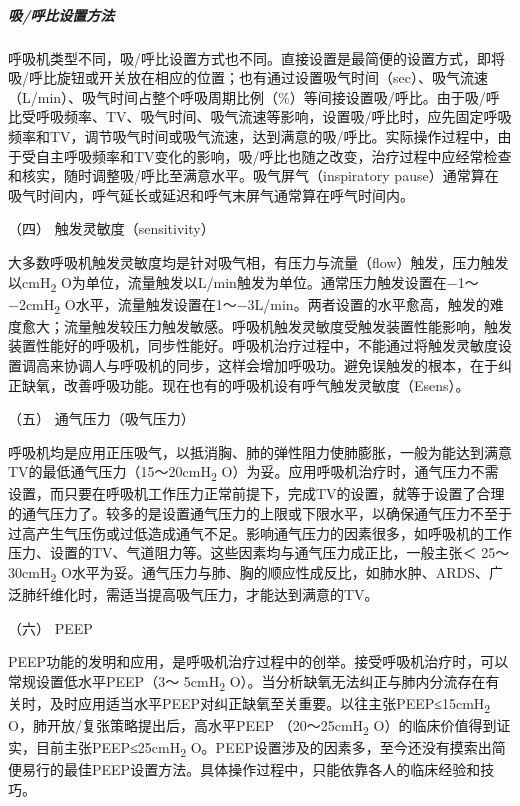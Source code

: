 \subparagraph{吸/呼比设置方法}

呼吸机类型不同，吸/呼比设置方式也不同。直接设置是最简便的设置方式，即将吸/呼比旋钮或开关放在相应的位置；也有通过设置吸气时间（sec）、吸气流速（L/min）、吸气时间占整个呼吸周期比例（\%）等间接设置吸/呼比。由于吸/呼比受呼吸频率、TV、吸气时间、吸气流速等影响，设置吸/呼比时，应先固定呼吸频率和TV，调节吸气时间或吸气流速，达到满意的吸/呼比。实际操作过程中，由于受自主呼吸频率和TV变化的影响，吸/呼比也随之改变，治疗过程中应经常检查和核实，随时调整吸/呼比至满意水平。吸气屏气（inspiratory
pause）通常算在吸气时间内，呼气延长或延迟和呼气末屏气通常算在呼气时间内。

\hypertarget{text00370.htmlux5cux23CHP16-3-4-1-4}{}
（四） 触发灵敏度（sensitivity）

大多数呼吸机触发灵敏度均是针对吸气相，有压力与流量（flow）触发，压力触发以cmH\textsubscript{2}
O为单位，流量触发以L/min触发为单位。通常压力触发设置在−1～−2cmH\textsubscript{2}
O水平，流量触发设置在1～−3L/min。两者设置的水平愈高，触发的难度愈大；流量触发较压力触发敏感。呼吸机触发灵敏度受触发装置性能影响，触发装置性能好的呼吸机，同步性能好。呼吸机治疗过程中，不能通过将触发灵敏度设置调高来协调人与呼吸机的同步，这样会增加呼吸功。避免误触发的根本，在于纠正缺氧，改善呼吸功能。现在也有的呼吸机设有呼气触发灵敏度（Esens）。

\hypertarget{text00370.htmlux5cux23CHP16-3-4-1-5}{}
（五） 通气压力（吸气压力）

呼吸机均是应用正压吸气，以抵消胸、肺的弹性阻力使肺膨胀，一般为能达到满意TV的最低通气压力（15～20cmH\textsubscript{2}
O）为妥。应用呼吸机治疗时，通气压力不需设置，而只要在呼吸机工作压力正常前提下，完成TV的设置，就等于设置了合理的通气压力了。较多的是设置通气压力的上限或下限水平，以确保通气压力不至于过高产生气压伤或过低造成通气不足。影响通气压力的因素很多，如呼吸机的工作压力、设置的TV、气道阻力等。这些因素均与通气压力成正比，一般主张＜
25～30cmH\textsubscript{2}
O水平为妥。通气压力与肺、胸的顺应性成反比，如肺水肿、ARDS、广泛肺纤维化时，需适当提高吸气压力，才能达到满意的TV。

\hypertarget{text00370.htmlux5cux23CHP16-3-4-1-6}{}
（六） PEEP

PEEP功能的发明和应用，是呼吸机治疗过程中的创举。接受呼吸机治疗时，可以常规设置低水平PEEP（3～
5cmH\textsubscript{2}
O）。当分析缺氧无法纠正与肺内分流存在有关时，及时应用适当水平PEEP对纠正缺氧至关重要。以往主张PEEP≤15cmH\textsubscript{2}
O，肺开放/复张策略提出后，高水平PEEP （20～25cmH\textsubscript{2}
O）的临床价值得到证实，目前主张PEEP≤25cmH\textsubscript{2}
O。PEEP设置涉及的因素多，至今还没有摸索出简便易行的最佳PEEP设置方法。具体操作过程中，只能依靠各人的临床经验和技巧。

